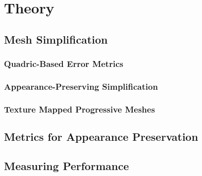 
\chapter{Theory} \label{ch:theory}

\section{Mesh Simplification} \label{sec:mesh_simplification}

\subsection{Quadric-Based Error Metrics} \label{sec:quadric-based_error_metrics}

\subsection{Appearance-Preserving Simplification} \label{sec:appearance-preserving_simplification}

\subsection{Texture Mapped Progressive Meshes} \label{sec:texture-mapped_progressive_meshes}

\section{Metrics for Appearance Preservation} \label{sec:metrics_for_appearance_preservation}

\section{Measuring Performance} \label{measuring_performance}


